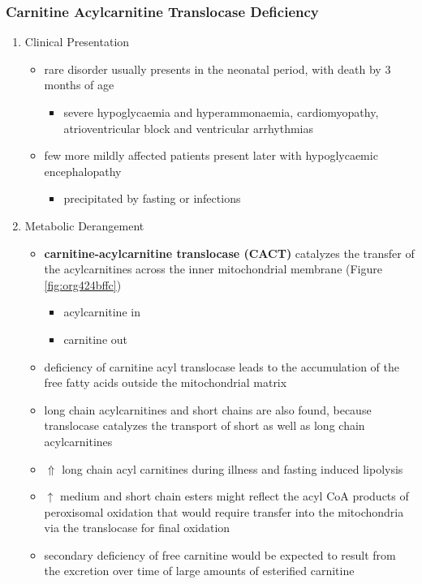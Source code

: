 \documentclass[12pt]{scrartcl}
\begin{document}
\subsubsection{Carnitine Acylcarnitine Translocase Deficiency}
\label{sec:orgf3169d1}
\begin{enumerate}
\item Clinical Presentation
\label{sec:org2a5a7ec}
\begin{itemize}
\item rare disorder usually presents in the neonatal period, with
death by 3 months of age
\begin{itemize}
\item severe hypoglycaemia and hyperammonaemia, cardiomyopathy,
atrioventricular block and ventricular arrhythmias
\end{itemize}
\item few more mildly affected patients present later with hypoglycaemic
encephalopathy
\begin{itemize}
\item precipitated by fasting or infections
\end{itemize}
\end{itemize}
\item Metabolic Derangement
\label{sec:org1876a0b}
\begin{itemize}
\item \textbf{carnitine-acylcarnitine translocase (CACT)} catalyzes the transfer
of the acylcarnitines across the inner mitochondrial membrane
(Figure \ref{fig:org424bffc})
\begin{itemize}
\item acylcarnitine in
\item carnitine out
\end{itemize}
\item deficiency of carnitine acyl translocase leads to the accumulation
of the free fatty acids outside the mitochondrial matrix
\item long chain acylcarnitines and short chains are also found, because
translocase catalyzes the transport of short as well as long chain
acylcarnitines
\item \(\Uparrow\) long chain acyl carnitines during illness and fasting
induced lipolysis
\item \(\uparrow\) medium and short chain esters might reflect the acyl CoA products
of peroxisomal oxidation that would require transfer into the
mitochondria via the translocase for final oxidation
\item secondary deficiency of free carnitine would be expected to result
from the excretion over time of large amounts of esterified
carnitine
\end{itemize}


\end{enumerate}
\end{document}
